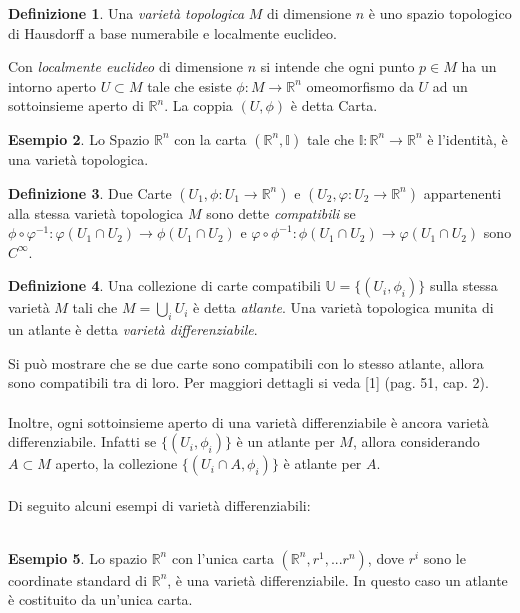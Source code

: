 \documentclass[12pt,a4paper]{report}
\theoremstyle{definition}
\newtheorem{Def}{Definizione}[chapter]
\theoremstyle{definition}
\newtheorem{Ex}[Def]{Esempio}
\theoremstyle{definition}
\theoremstyle{remark}
\begin{document}
\begin{Def}
	Una \textit{varietà topologica} $M$ di dimensione $n$ è uno spazio topologico di Hausdorff a base numerabile e localmente euclideo.
\end{Def}
Con \textit{localmente euclideo} di dimensione $n$ si intende che ogni punto $p\in M$ ha un intorno aperto $U\subset M$ tale che esiste $\phi:M\rightarrow\mathbb{R}^n$ omeomorfismo da $U$ ad un sottoinsieme aperto di $\mathbb{R}^n$. La coppia $(U,\phi)$ è detta Carta.
\begin{Ex}
	Lo Spazio $\mathbb{R}^n$ con la carta $(\mathbb{R}^n,\mathbb{I})$ tale che $\mathbb{I}:\mathbb{R}^n\rightarrow \mathbb{R}^n$ è l'identità, è una varietà topologica. 
\end{Ex}
\begin{Def}
	Due Carte $(U_1,\phi:U_1\rightarrow\mathbb{R}^n)$ e $(U_2,\varphi:U_2\rightarrow\mathbb{R}^n)$ appartenenti alla stessa varietà topologica $M$ sono dette \textit{compatibili} se \\
	$\phi\circ\varphi^{-1}:\varphi(U_1\cap U_2)\rightarrow \phi(U_1\cap U_2)$ e $\varphi\circ\phi^{-1}:\phi(U_1\cap U_2)\rightarrow \varphi(U_1\cap U_2)$ sono $C^\infty$.
\end{Def}
\begin{Def}
	Una collezione di carte compatibili $\mathbb{U}=\{(U_i,\phi_{i})\}$ sulla stessa varietà $M$ tali che $M=\bigcup_i U_i$ è detta \textit{atlante}. Una varietà topologica munita di un atlante è detta \textit{varietà differenziabile}.
\end{Def}
Si può mostrare che se due carte sono compatibili con lo stesso atlante, allora sono compatibili tra di loro. Per maggiori dettagli si veda [1] (pag. 51, cap. 2).\\
\\
Inoltre, ogni sottoinsieme aperto di una varietà differenziabile è ancora varietà differenziabile. Infatti se $\{(U_i,\phi_i)\}$ è un atlante per $M$, allora considerando $A\subset M$ aperto, la collezione $\{(U_i\cap A,\phi_i)\}$ è atlante per $A$.\\\\
Di seguito alcuni esempi di varietà differenziabili:\\
\\
\begin{Ex}
	Lo spazio $\mathbb{R}^n$ con l'unica carta $(\mathbb{R}^n,r^1,...r^n)$, dove $r^i$ sono le coordinate standard di $\mathbb{R}^n$, è una varietà differenziabile. In questo caso un atlante è costituito da un'unica carta.\\
\end{Ex}
\end{document}
